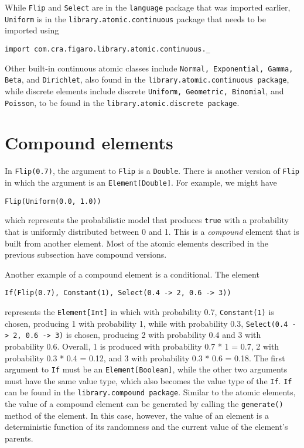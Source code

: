 While \texttt{Flip} and \texttt{Select} are in the \texttt{language} package that was imported earlier, \texttt{Uniform} is in the \texttt{library.atomic.continuous} package that needs to be imported using
 
\begin{flushleft}
\texttt{import com.cra.figaro.library.atomic.continuous.\_}
\end{flushleft}

Other built-in continuous atomic classes include \texttt{Normal, Exponent\-ial, Gamma, Beta}, and \texttt{Dirichlet}, also found in the \texttt{library.atomic.\-continuous package}, while discrete elements include discrete \texttt{Uniform, Geometric, Binomial}, and \texttt{Poisson}, to be found in the \texttt{library.atomic.\-discrete package}.

\section{Compound elements}

In \texttt{Flip(0.7)}, the argument to \texttt{Flip} is a \texttt{Double}. There is another version of \texttt{Flip} in which the argument is an \texttt{Element[Double]}. For example, we might have

\begin{flushleft}
\texttt{Flip(Uniform(0.0, 1.0)) }
\end{flushleft}

which represents the probabilistic model that produces \texttt{true} with a probability that is uniformly distributed between 0 and 1. This is a \emph{compound} element that is built from another element. Most of the atomic elements described in the previous subsection have compound versions.

Another example of a compound element is a conditional. The element

\begin{flushleft}
\texttt{If(Flip(0.7), Constant(1), Select(0.4 -> 2, 0.6 -> 3))}
\end{flushleft}

represents the \texttt{Element[Int]} in which with probability 0.7, \texttt{Constant\-(1)} is chosen, producing 1 with probability 1, while with probability 0.3, \texttt{Select(0.4
-> 2, 0.6 -> 3)} is chosen, producing 2 with probability 0.4 and 3 with probability 0.6. Overall, 1 is produced with probability 0.7 * 1 = 0.7, 2 with probability 0.3 * 0.4 = 0.12, and 3 with probability 0.3 * 0.6 = 0.18. The first argument to \texttt{If} must be an \texttt{Element[Boolean]}, while the other two arguments must have the same value type, which also becomes the value type of the \texttt{If}. \texttt{If} can be found in the \texttt{library.compound package}. Similar to the atomic elements, the value of a compound element can be generated by calling the \texttt{generate()} method of the element. In this case, however, the value of an element is a deterministic function of its randomness and the current value of the element's parents.

